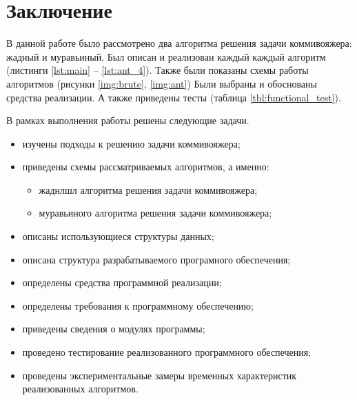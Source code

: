 \chapter*{Заключение}

В данной работе было рассмотрено два алгоритма решения задачи коммивояжера: жадный и муравьиный.
Был описан и реализован каждый каждый алгоритм (листинги \ref{lst:main} -- \ref{lst:ant_4}).
Также были показаны схемы работы алгоритмов (рисунки \ref{img:brute}, \ref{img:ant}) 
Были выбраны и обоснованы средства реализации. 
А также приведены тесты (таблица \ref{tbl:functional_test}).


В рамках выполнения работы решены следующие задачи.
\begin{itemize}
    \item изучены подходы к решению задачи коммивояжера;
    \item приведены схемы рассматриваемых алгоритмов, а именно:
	\begin{itemize}
	    \item жаднлшл алгоритма решения задачи коммивояжера;
	    \item муравьиного алгоритма решения задачи коммивояжера;
	\end{itemize}
	\item описаны использующиеся структуры данных;
	\item описана структура разрабатываемого програмного обеспечения;
	\item определены средства программной реализации;
	\item определены требования к программному обеспечению;
	\item приведены сведения о модулях программы;
	\item проведено тестирование реализованного программного обеспечения;
	\item проведены экспериментальные замеры временных характеристик реализованных алгоритмов.
\end{itemize}
